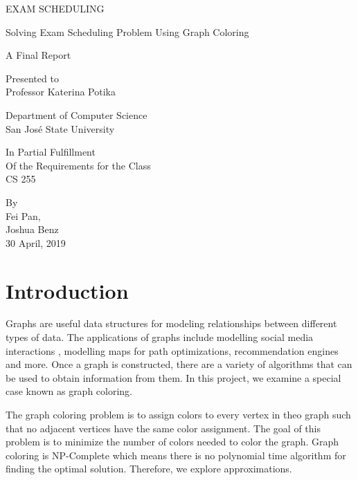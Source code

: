 \documentclass[12]{article}
\begin{document}
\begin{titlepage}


\setlength{\parindent}{0pt}
    \vspace*{-3.8\baselineskip}
    \MakeUppercase{{\tiny  Exam Scheduling}} \hfill 
    \begin{center}
    
    \vfill
     Solving Exam Scheduling Problem  Using Graph Coloring
\\
    \vfill
    
    A  Final Report\\
    \vfill
    
    Presented to  \\
    Professor Katerina Potika\\
    \vfill
    
    Department of Computer Science\\
    San Jos\'e State University\\
    \vfill
    
    In Partial Fulfillment\\
    Of the Requirements for the Class\\
    CS 255\\
    \vfill
    
    By\\ 
    Fei Pan,\\
    Joshua Benz\\
    30 April, 2019\\
\end{center}
\end{titlepage}

\tableofcontents
\thispagestyle{mypagestyle}
\clearpage
{}
\setcounter{page}{1}
\setlength{\parindent}{4em}
\renewcommand{\baselinestretch}{1.5}

\section{Introduction}
Graphs are useful data structures for modeling relationships between different types of data. The applications of graphs include modelling social media interactions , modelling maps for path optimizations, recommendation engines and more. Once a graph is constructed, there are a variety of algorithms that can be used to obtain information from them. In this project, we examine a special case known as graph coloring.

The graph coloring problem is to assign colors to every vertex in theo graph such that no adjacent vertices have the same color assignment. The goal of this problem is to minimize the number of colors needed to color the graph. Graph coloring is NP-Complete which means there is no polynomial time algorithm for finding the optimal solution. Therefore, we explore approximations. 
\end{document}
